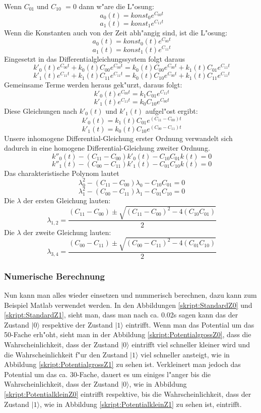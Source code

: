 \begin{refsection}
Wenn $ C_{01}$ und $ C_{10}$ $ =0$ dann w"are die L"osung:
\[
\ a_{0}(t) = \text{$konst_{0}$} e^{C_{00} t} 
\]
\[
\ a_{1}(t) = \text{$konst_{1}$} e^{C_{11} t}
\]
Wenn die Konstanten auch von der Zeit abh"angig sind, ist die L"osung: 
\[
\ a_{0}(t) = \text{$konst_{0}(t)$} e^{C_{00} t} 
\]
\[
\ a_{1}(t) = \text{$konst_{1}(t)$} e^{C_{11} t} 
\]
Eingesetzt in das Differentialgleichungssystem folgt daraus
\[
\ k'_{0}(t) e^{C_{00} t} + k_{0}(t) C_{00} e^{C_{00} t} = k_{0}(t) C_{00} e^{C_{00} t} + k_{1}(t)C_{01}e^{C_{11} t}
\]
\[
\ k'_{1}(t) e^{C_{11} t} + k_{1}(t) C_{11} e^{C_{11} t} = k_{0}(t) C_{10} e^{C_{00} t} + k_{1}(t)C_{11}e^{C_{11} t}
\]
Gemeinsame Terme werden heraus gek"urzt, daraus folgt:
\[
\ k'_{0}(t) e^{C_{00} t} = k_{1} C_{01} e^{C_{11} t}
\]
\[
\ k'_{1}(t) e^{C_{11} t} = k_{0} C_{10} e^{C_{00} t}
\]
Diese Gleichungen nach $ k'_{0}(t)$ und $ k'_{1}(t)$ aufgel"ost ergibt:
\[
\ k'_{0}(t) = k_{1}(t) C_{01} e^{(C_{11}-C_{00}) t}
\]
\[
\ k'_{1}(t) = k_{0}(t) C_{10} e^{(C_{00}-C_{11}) t}
\]
Unsere inhomogene Differential-Gleichung erster Ordnung verwandelt sich dadurch in eine homogene Differential-Gleichung zweiter Ordnung.
\[ 
\ k''_{0}(t) - (C_{11}-C_{00}) k'_{0}(t) - C_{10}C_{01}k(t) = 0
\]
\[
\ k''_{1}(t) - (C_{00}-C_{11}) k'_{1}(t) - C_{01}C_{10}k(t) = 0
\]
Das charakteristische Polynom lautet
\[
\ \lambda_{0}^{2} - (C_{11}-C_{00})\lambda_{0} - C_{10}C_{01} = 0
\]
\[
\ \lambda_{1}^{2} - (C_{00}-C_{11})\lambda_{1} - C_{01}C_{10} = 0
\]
Die $ \lambda $ der ersten Gleichung lauten:
\[
\ \lambda_{1,2} = \frac{(C_{11}-C_{00})\pm \sqrt{(C_{11}-C_{00})^2-4(C_{10}C_{01})}}{2}
\]
Die $ \lambda $ der zweite Gleichung lauten:
\[
\ \lambda_{3,4} = \frac{(C_{00}-C_{11})\pm \sqrt{(C_{00}-C_{11})^2-4(C_{01}C_{10})}}{2}
\]

\subsubsection{Numerische Berechnung}
Nun kann man alles wieder einsetzen und nummerisch berechnen, dazu kann
zum Beispiel Matlab verwendet werden.
In den Abbildungen \ref{skript:StandardZ0} und \ref{skript:StandardZ1},
sieht man, dass man nach ca. 0.02s sagen kann das der Zustand
$|0\rangle$ respektive der Zustand $|1\rangle$ eintrifft. Wenn man
das Potential um das 50-Fache erh"oht, sieht man in der Abbildung
\ref{skript:PotentialgrossZ0}, dass die Wahrscheinlichkeit, dass
der Zustand $|0\rangle$ eintrifft viel schneller kleiner wird und die
Wahrscheinlichkeit f"ur den Zustand $|1\rangle$ viel schneller ansteigt,
wie in Abbildung \ref{skript:PotentialgrossZ1} zu sehen ist. Verkleinert
man jedoch das Potential um das ca. 30-Fache, dauert es um einiges
l"anger bis die Wahrscheinlichkeit, dass der Zustand $|0\rangle$, wie
in Abbildung \ref{skript:PotentialkleinZ0} eintrifft respektive, bis
die Wahrscheinlichkeit, dass der Zustand $|1\rangle$, wie in Abbildung
\ref{skript:PotentialkleinZ1} zu sehen ist, eintrifft.


\end{refsection}
